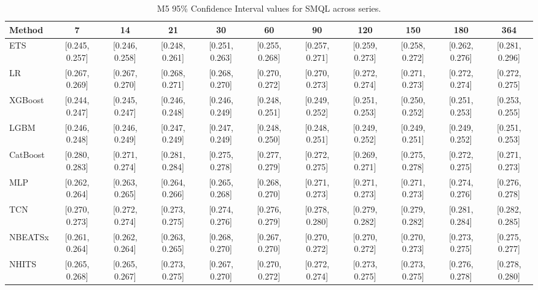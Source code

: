\begin{table}[!ht]
\centering
\begin{adjustbox}{max width=\textwidth}
\begin{tabular}{lcccccccccc}
\toprule
Method & 7 & 14 & 21 & 30 & 60 & 90 & 120 & 150 & 180 & 364 \\
\midrule
ETS & [0.245, 0.257] & [0.246, 0.258] & [0.248, 0.261] & [0.251, 0.263] & [0.255, 0.268] & [0.257, 0.271] & [0.259, 0.273] & [0.258, 0.272] & [0.262, 0.276] & [0.281, 0.296] \\
LR & [0.267, 0.269] & [0.267, 0.270] & [0.268, 0.271] & [0.268, 0.270] & [0.270, 0.272] & [0.270, 0.273] & [0.272, 0.274] & [0.271, 0.273] & [0.272, 0.274] & [0.272, 0.275] \\
XGBoost & [0.244, 0.247] & [0.245, 0.247] & [0.246, 0.248] & [0.246, 0.249] & [0.248, 0.251] & [0.249, 0.252] & [0.251, 0.253] & [0.250, 0.252] & [0.251, 0.253] & [0.253, 0.255] \\
LGBM & [0.246, 0.248] & [0.246, 0.249] & [0.247, 0.249] & [0.247, 0.249] & [0.248, 0.250] & [0.248, 0.251] & [0.249, 0.252] & [0.249, 0.251] & [0.249, 0.252] & [0.251, 0.253] \\
CatBoost & [0.280, 0.283] & [0.271, 0.274] & [0.281, 0.284] & [0.275, 0.278] & [0.277, 0.279] & [0.272, 0.275] & [0.269, 0.271] & [0.275, 0.278] & [0.272, 0.275] & [0.271, 0.273] \\
MLP & [0.262, 0.264] & [0.263, 0.265] & [0.264, 0.266] & [0.265, 0.268] & [0.268, 0.270] & [0.271, 0.273] & [0.271, 0.273] & [0.271, 0.273] & [0.274, 0.276] & [0.276, 0.278] \\
TCN & [0.270, 0.273] & [0.272, 0.274] & [0.273, 0.275] & [0.274, 0.276] & [0.276, 0.279] & [0.278, 0.280] & [0.279, 0.282] & [0.279, 0.282] & [0.281, 0.284] & [0.282, 0.285] \\
NBEATSx & [0.261, 0.264] & [0.262, 0.264] & [0.263, 0.265] & [0.268, 0.270] & [0.267, 0.270] & [0.270, 0.272] & [0.270, 0.272] & [0.270, 0.273] & [0.273, 0.275] & [0.275, 0.277] \\
NHITS & [0.265, 0.268] & [0.265, 0.267] & [0.273, 0.275] & [0.267, 0.270] & [0.270, 0.272] & [0.272, 0.274] & [0.273, 0.275] & [0.273, 0.275] & [0.276, 0.278] & [0.278, 0.280] \\
\bottomrule
\end{tabular}
\end{adjustbox}
\caption{M5 95\% Confidence Interval values for SMQL across series.}
\label{tab:ci_m5_scaled_mqloss}
\end{table}

